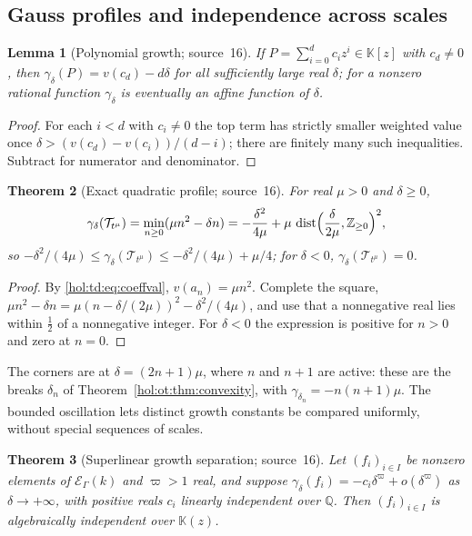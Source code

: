 \documentclass[11pt]{article}
\numberwithin{equation}{section}
\newtheorem{theorem}{Theorem}[section]
\newtheorem{lemma}[theorem]{Lemma}
\theoremstyle{definition}
\theoremstyle{remark}
\newcommand{\Q}{\mathbb Q}
\newcommand{\Z}{\mathbb Z}
\newcommand{\KK}{\mathbb K}
\newcommand{\EK}{\mathcal E_\Gamma(k)}
\begin{document}
\subsection{Gauss profiles and independence across scales}
\label{hol:th:sub:profiles}

\begin{lemma}[Polynomial growth; source~16]\label{hol:th:lem:poly}
If $P=\sum_{i=0}^dc_iz^i\in\KK[z]$ with $c_d\ne0$, then
$\gamma_\delta(P)=v(c_d)-d\delta$ for all sufficiently large real $\delta$;
for a nonzero rational function $\gamma_\delta$ is eventually an affine
function of $\delta$.
\end{lemma}

\begin{proof}
For each $i<d$ with $c_i\ne0$ the top term has strictly smaller weighted value
once $\delta>(v(c_d)-v(c_i))/(d-i)$; there are finitely many such
inequalities. Subtract for numerator and denominator.
\end{proof}

\begin{theorem}[Exact quadratic profile; source~16]\label{hol:th:thm:profile}
For real $\mu>0$ and $\delta\ge0$,
\[
 \gamma_\delta(\mathcal T_{t^\mu})=\min_{n\ge0}(\mu n^2-\delta n)
 =-\frac{\delta^2}{4\mu}+\mu\,\operatorname{dist}\Bigl(\frac\delta{2\mu},
 \Z_{\ge0}\Bigr)^2,
\]
so $-\delta^2/(4\mu)\le\gamma_\delta(\mathcal T_{t^\mu})\le-\delta^2/(4\mu)+\mu/4$;
for $\delta<0$, $\gamma_\delta(\mathcal T_{t^\mu})=0$.
\end{theorem}

\begin{proof}
By \eqref{hol:td:eq:coeffval}, $v(a_n)=\mu n^2$. Complete the square,
$\mu n^2-\delta n=\mu(n-\delta/(2\mu))^2-\delta^2/(4\mu)$, and use that a
nonnegative real lies within $\frac12$ of a nonnegative integer. For
$\delta<0$ the expression is positive for $n>0$ and zero at $n=0$.
\end{proof}

The corners are at $\delta=(2n+1)\mu$, where $n$ and $n+1$ are active: these
are the breaks $\delta_n$ of Theorem~\ref{hol:ot:thm:convexity}, with
$\gamma_{\delta_n}=-n(n+1)\mu$. The bounded oscillation lets distinct growth
constants be compared uniformly, without special sequences of scales.

\begin{theorem}[Superlinear growth separation; source~16]
\label{hol:th:thm:growth}
Let $(f_i)_{i\in I}$ be nonzero elements of $\EK$ and $\varpi>1$ real, and
suppose $\gamma_\delta(f_i)=-c_i\delta^\varpi+o(\delta^\varpi)$ as
$\delta\to+\infty$, with positive reals $c_i$ linearly independent over $\Q$.
Then $(f_i)_{i\in I}$ is algebraically independent over $\KK(z)$.
\end{theorem}
\end{document}
